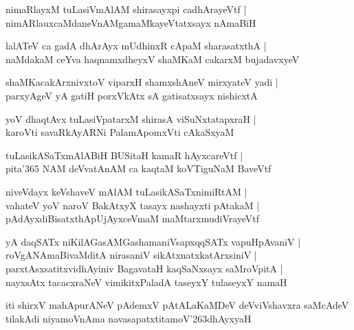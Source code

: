 \documentclass[twoside,12pt,openright]{book}
\def\S{\char'263}
\newcounter{shloka}[chapter]
\begin{document}
\begin{shloka}%
nimaRlayxM tuLasiVmAlAM shirasayxpi cadhArayeVtf |\\
nimARlauxcaMdaneVnAMgamaMkayeVtatxsayx nAmaBiH
\end{shloka}

\begin{shloka}%
lalATeV ca gadA dhArAyx mUdhinxR cApaM sharasatxthA |\\
naMdakaM ceYva haqnamxdheyxV shaMKaM cakarxM bujadavxyeV 
\end{shloka}

\begin{shloka}%
shaMKacakArxnivxtoV viparxH shamxshAneV mirxyateV yadi |\\
parxyAgeV yA gatiH porxVkAtx sA gatisatxsayx nishicxtA 
\end{shloka}

\begin{shloka}%
yoV dhaqtAvx tuLasiVpatarxM shirasA viSuNxtatapxraH |\\
karoVti savaRkAyARNi PalamApomxVti cAkaSxyaM 
\end{shloka}

\begin{shloka}%
tuLasikASaTxmAlABiH BUSitaH kamaR hAyxcareVtf |\\
pita\char'365 NAM  deVvatAnAM ca kaqtaM koVTiguNaM BaveVtf
\end{shloka}

\begin{shloka}%
niveVdayx keVshaveV mAlAM tuLasikASaTxnimiRtAM |\\
vahateV yoV naroV BakAtxyX tasayx nashayxti pAtakaM |\\
pAdAyxdiBisatxthApUjAyxceVmaM maMtarxmudiVrayeVtf 
\end{shloka}

\begin{shloka}%
yA daqSATx niKilAGasAMGashamaniVsapxqqSATx vapuHpAvaniV |\\
roVgANAmaBivaMditA nirasaniV sikAtxnatxkatArxsiniV |\\
parxtAsxsatitxvidhAyiniv BagavataH kaqSaNxsayx saMroVpitA |\\
nayxsAtx tacacxraNeV vimikitxPaladA taseyxY tulaseyxY namaH 
\end{shloka}

\begin{center}
iti shirxV mahApurANeV pAdemxV pAtALaKaMDeV deVviVshavxra saMcAdeV tilakAdi niyamoVnAma 
navasapatxtitamoV\S dhAyxyaH
\end{center}
\end{document}
